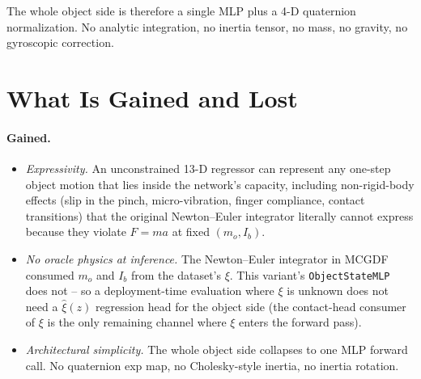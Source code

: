 \documentclass[11pt]{article}
\begin{document}
The whole object side is therefore a single MLP plus a 4-D
quaternion normalization.  No analytic integration, no inertia
tensor, no mass, no gravity, no gyroscopic correction.

\section{What Is Gained and Lost}

\paragraph{Gained.}
\begin{itemize}
  \item \emph{Expressivity.}  An unconstrained 13-D regressor can
    represent any one-step object motion that lies inside the
    network's capacity, including non-rigid-body effects (slip in the
    pinch, micro-vibration, finger compliance, contact transitions)
    that the original Newton--Euler integrator literally cannot
    express because they violate $F = m a$ at fixed $(m_o, I_b)$.
  \item \emph{No oracle physics at inference.}  The Newton--Euler
    integrator in MCGDF consumed $m_o$ and $I_b$ from the dataset's
    $\xi$.  This variant's \texttt{ObjectStateMLP} does not -- so a
    deployment-time evaluation where $\xi$ is unknown does not need a
    $\hat\xi(z)$ regression head for the object side (the
    contact-head consumer of $\xi$ is the only remaining channel
    where $\xi$ enters the forward pass).
  \item \emph{Architectural simplicity.}  The whole object side
    collapses to one MLP forward call.  No quaternion exp map, no
    Cholesky-style inertia, no inertia rotation.
\end{itemize}
\end{document}

